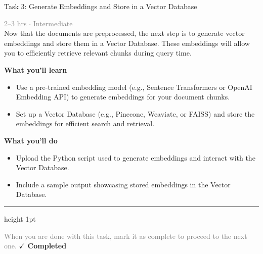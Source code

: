 \documentclass[10pt,a4paper]{article}
\begin{document}
\begin{taskbox}{Task 3: Generate Embeddings and Store in a Vector Database}

    {\small \textcolor{gray}{2--3 hrs $\cdot$ Intermediate}}\\[12pt]

     Now that the documents are preprocessed, the next step is to generate vector embeddings and store them in a Vector Database. These embeddings will allow you to efficiently retrieve relevant chunks during query time.  


\vspace{8pt}
{\large \textbf{\textcolor{brandLight}{What you'll learn}}}\\[4pt]  
\begin{itemize}
    \item Use a pre-trained embedding model (e.g., Sentence Transformers or OpenAI Embedding API) to generate embeddings for your document chunks.  
    \item Set up a Vector Database (e.g., Pinecone, Weaviate, or FAISS) and store the embeddings for efficient search and retrieval.  
\end{itemize}

\vspace{8pt}
{\large \textbf{\textcolor{brandLight}{What you'll do}}}\\[4pt]  
\begin{itemize}
    \item Upload the Python script used to generate embeddings and interact with the Vector Database.  
    \item Include a sample output showcasing stored embeddings in the Vector Database.\par
\end{itemize}

    \vspace{16pt}

    \textcolor{cardBorder}{\hrule height 1pt}\vspace{8pt}

    \small \textcolor{gray}{When you are done with this task, mark it as complete to proceed to the next one.} \hfill \textbf{\textcolor{brandDark}{$\checkmark$ Completed}}

\end{taskbox}
\end{document}
